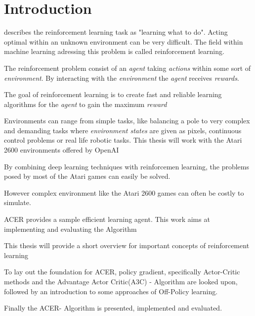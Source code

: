 \section{Introduction}\raggedbottom 
\citet{Sut98} describes the reinforcement learning  task as "learning what to do".
Acting optimal within an unknown environment can be very difficult.
The field within machine learning adressing this problem is called reinforcement learning.

The reinforcement problem consist of an \textit{agent} taking \textit{actions} within some sort of \textit{environment}.
By interacting with the \textit{environment} the \textit{agent} receives \textit{rewards}.

The goal of reinforcement learning is to create fast and reliable learning algorithms for the \textit{agent} to gain the maximum \textit{reward}

Environments can range from simple tasks, like balancing a pole to very complex and demanding tasks where \textit{environment states} are given as pixels, continuous control problems or real life robotic tasks.
This thesis will work with the Atari 2600 environments offered by OpenAI \citep{openaigym}

By combining deep learning techniques \citep{Hinton504} with reinforcemen learning, the problems posed by most of the Atari games can easily be solved.

However complex environment like the Atari 2600 games can often be costly to simulate.

ACER \citep{ACER} provides a sample efficient learning agent. This work aims at implementing and evaluating the Algorithm

This thesis will provide a short overview for important concepts of reinforcement learning

To lay out the foundation for ACER, policy gradient, specifically Actor-Critic methods and the Advantage Actor Critic(A3C) - Algorithm \citep{A3C} are looked upon, followed by an introduction to some approaches of Off-Policy learning.

Finally the ACER- Algorithm is presented, implemented and evaluated.



\pagebreak